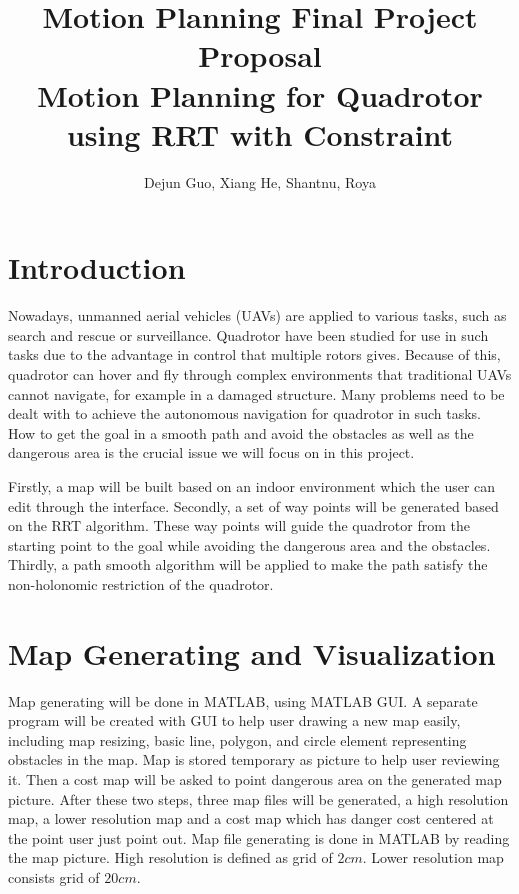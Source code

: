 \documentclass[dvips,12pt]{article}
\begin{document}

\title{Motion Planning Final Project Proposal \\Motion Planning for Quadrotor using RRT with Constraint}
\author{Dejun Guo, Xiang He, Shantnu, Roya}
\date{}

\maketitle


\section{Introduction}
Nowadays, unmanned aerial vehicles (UAVs) are applied to various tasks, such as search and rescue or surveillance.  Quadrotor have been studied for use in such tasks due to the advantage in control that multiple rotors gives. Because of this, quadrotor can hover and fly through complex environments that traditional UAVs cannot navigate, for example in a damaged structure. Many problems need to be dealt with to achieve the autonomous navigation for quadrotor in such tasks. How to get the goal in a smooth path and avoid the obstacles as well as the dangerous area is the crucial issue we will focus on in this project.

Firstly, a map will be built based on an indoor environment which the user can edit through the interface. Secondly, a set of way points will be generated based on the RRT algorithm. These way points will guide the quadrotor from the starting point to the goal while avoiding the dangerous area and the obstacles. Thirdly, a path smooth algorithm will be applied to make the path satisfy the non-holonomic restriction of the quadrotor.



\section{Map Generating and Visualization}
Map generating will be done in MATLAB, using MATLAB GUI. A separate program will be created with GUI to help user drawing a new map easily, including map resizing, basic line, polygon, and circle element representing obstacles in the map. Map is stored temporary as picture to help user reviewing it. Then a cost map will be asked to point dangerous area on the generated map picture. After these two steps, three map files will be generated, a high resolution map, a lower resolution map and a cost map which has danger cost centered at the point user just point out. Map file generating is done in MATLAB by reading the map picture. High resolution is defined as grid of $2cm$. Lower resolution map consists grid of $20cm$.
\end{document}
